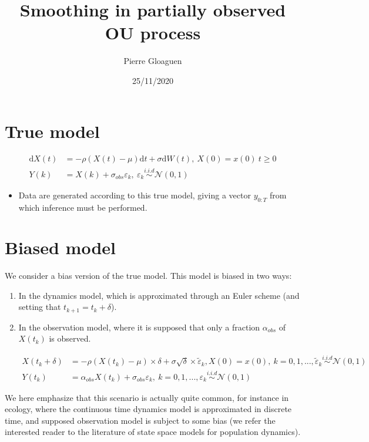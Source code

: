 \documentclass[]{article}
\title{Smoothing in partially observed OU process}
\author{Pierre Gloaguen}
\date{25/11/2020}
\providecommand{\tightlist}{%
  \setlength{\itemsep}{0pt}\setlength{\parskip}{0pt}}
\begin{document}
\maketitle

\section{True model}\label{true-model}

\begin{align}
\text{d} X(t) &= -\rho(X(t) - \mu) \text{d}t + \sigma \text{d}W(t),~X(0) = x(0)~t\geq 0\\
Y(k) &= X(k) + \sigma_{obs}\varepsilon_k,~ \varepsilon_k \overset{i.i.d}{\sim} \mathcal{N}(0, 1)
\end{align}

\begin{itemize}
\tightlist
\item
  Data are generated according to this true model, giving a vector
  \(y_{0:T}\) from which inference must be performed.
\end{itemize}

\section{Biased model}\label{biased-model}

We consider a bias version of the true model. This model is biased in
two ways:

\begin{enumerate}
\def\labelenumi{\arabic{enumi}.}
\tightlist
\item
  In the dynamics model, which is approximated through an Euler scheme
  (and setting that \(t_{k + 1} = t_k + \delta\)).
\item
  In the observation model, where it is supposed that only a fraction
  \(\alpha_{obs}\) of \(X(t_k)\) is observed.

  \begin{align}
  X(t_k + \delta) &= -\rho(X(t_k) - \mu)\times \delta + \sigma\sqrt{\delta} \times \tilde{\varepsilon}_k, X(0) = x(0), ~k =  0, 1,..., \tilde{\varepsilon}_k \overset{i.i.d}{\sim} \mathcal{N}(0, 1)\\
  Y(t_k) &= \alpha_{obs}X(t_k) + \sigma_{obs}\varepsilon_k,~k = 0, 1, ..., \varepsilon_k \overset{i.i.d}{\sim} \mathcal{N}(0, 1)
  \end{align}
\end{enumerate}

We here emphasize that this scenario is actually quite common, for
instance in ecology, where the continuous time dynamics model is
approximated in discrete time, and supposed observation model is subject
to some bias (we refer the interested reader to the literature of state
space models for population dynamics).
\end{document}

